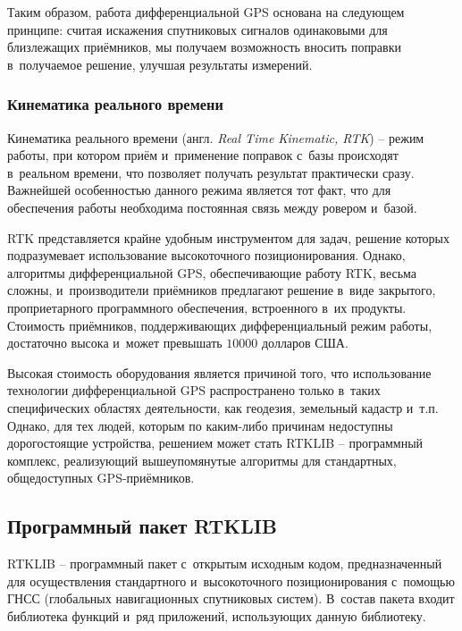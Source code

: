 Таким образом, работа дифференциальной GPS основана на следующем принципе: считая искажения спутниковых сигналов одинаковыми для близлежащих приёмников, мы получаем возможность вносить поправки в~получаемое решение, улучшая результаты измерений.

\subsubsection{Кинематика реального времени}

Кинематика реального времени (англ. \emph{Real Time Kinematic, RTK}) -- режим работы, при котором приём и~применение поправок с~базы происходят в~реальном времени, что позволяет получать результат практически сразу. Важнейшей особенностью данного режима является тот факт, что для обеспечения работы необходима постоянная связь между ровером и~базой. \par

RTK представляется крайне удобным инструментом для задач, решение которых подразумевает использование высокоточного позиционирования. Однако, алгоритмы дифференциальной GPS, обеспечивающие работу RTK, весьма сложны, и~производители приёмников предлагают решение в~виде закрытого, проприетарного программного обеспечения, встроенного в~их продукты. Стоимость приёмников, поддерживающих дифференциальный режим работы, достаточно высока и~может превышать $10000$ долларов США. \par

Высокая стоимость оборудования является причиной того, что использование технологии дифференциальной GPS распространено только в~таких специфических областях деятельности, как геодезия, земельный кадастр и~т.п. Однако, для тех людей, которым по каким-либо причинам недоступны дорогостоящие устройства, решением может стать RTKLIB -- программный комплекс, реализующий вышеупомянутые алгоритмы для стандартных, общедоступных GPS-приёмников.

\subsection{Программный пакет RTKLIB}

RTKLIB -- программный пакет с~открытым исходным кодом, предназначенный для осуществления стандартного и~высокоточного позиционирования с~помощью ГНСС (глобальных навигационных спутниковых систем). В~состав пакета входит библиотека функций и~ряд приложений, использующих данную библиотеку. \par

